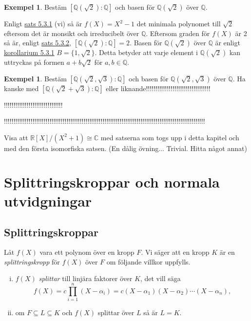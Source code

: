 \documentclass{article}
\theoremstyle{definition}
\newtheorem{exmp}[thm]{Exempel}
\begin{document}
\begin{exmp}
  Bestäm $[\mathbb{Q}(\sqrt{2}): \mathbb{\mathbb{Q}}]$ och basen för $\mathbb{Q}(\sqrt{2})$ över $\mathbb{Q}$.

  Enligt \hyperlink{minpol}{sats 5.3.1} (vi) så är $f(X) = X^2-1$ det minimala polynomet till $\sqrt{2}$ eftersom det är monsikt och irreducibelt över $\mathbb{Q}$. 
  Eftersom graden för $f(X)$ är 2 så är, enligt \hyperlink{5.3.2}{sats 5.3.2}, $[\mathbb{Q}(\sqrt{2}): \mathbb{\mathbb{Q}}] = 2.$ Basen för $\mathbb{Q}(\sqrt{2})$ över $\mathbb{Q}$
  är enligt \hyperlink{kol5.3.1}{korollarium 5.3.1} $B = \{1, \sqrt{2}\}$. Detta betyder att varje element i $\mathbb{Q}(\sqrt{2})$ kan uttryckas 
  på formen $a + b\sqrt{2}$ för $a, b \in \mathbb{Q}.$

\end{exmp}

\begin{exmp}
  Bestäm $[\mathbb{Q}(\sqrt{2}, \sqrt{3}): \mathbb{\mathbb{Q}}]$ och basen för $\mathbb{Q}(\sqrt{2}, \sqrt{3})$ över $\mathbb{Q}$.
  Ha kanske med $[\mathbb{Q}(\sqrt{2} + \sqrt{3}): \mathbb{\mathbb{Q}}]$ eller liknande!!!!!!!!!!!!!!!!!!!!!!!!!!!!!!!!!!
  
  !!!!!!!!!!!!!!!!!!!!!!!!!!!!!!!

  !!!!!!!!!!!!!!!!!!!!!!!!!!!!!!!!!!!!!!!!!!!!!!!!!!!!!!!!!!!!!!!!!!!!!!!!!!!!!!!!!!!!!!!!!!!!!!!!!!!!!!!!!!
\end{exmp}

\begin{ovning}{4}
  Visa att $\mathbb{R}[X]/(X^2+1) \cong \mathbb{C}$ med satserna som togs upp i detta kapitel och med den första isomorfiska satsen. 
  (En dålig övning... Trivial. Hitta något annat) 
\end{ovning}

\section{Splittringskroppar och normala utvidgningar}
\subsection{Splittringskroppar}
\begin{mydef}{}{}
  Låt $f(X)$ vara ett polynom över en kropp $F$. Vi säger att en kropp $K$ är en \textit{splittringskropp} för $f(X)$ över $F$ om följande villkor uppfylls. 
  \begin{enumerate}[(i)]
    \item $f(X)$ \textit{splittar} till linjära faktorer över $K$, det vill säga 
    \[f(X) = c \prod_{i=1}^n (X- \alpha_i) = c(X-\alpha_1)(X-\alpha_2)\cdots (X-\alpha_n),\]
    \item om $F \subseteq L \subseteq K$ och $f(X)$ splittar över $L$ så är $L = K.$
  \end{enumerate}
\end{mydef}
\end{document}
